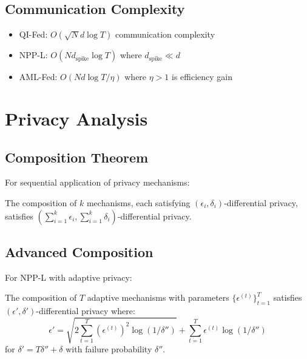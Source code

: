 \documentclass[12pt,a4paper]{article}
\begin{document}
\subsection{Communication Complexity}

\begin{theorem}
\begin{itemize}
\item QI-Fed: $O(\sqrt{N} d \log T)$ communication complexity
\item NPP-L: $O(N d_{\text{spike}} \log T)$ where $d_{\text{spike}} \ll d$
\item AML-Fed: $O(N d \log T / \eta)$ where $\eta > 1$ is efficiency gain
\end{itemize}
\end{theorem}

\section{Privacy Analysis}

\subsection{Composition Theorem}

For sequential application of privacy mechanisms:

\begin{theorem}
The composition of $k$ mechanisms, each satisfying $(\epsilon_i, \delta_i)$-differential privacy, satisfies $(\sum_{i=1}^k \epsilon_i, \sum_{i=1}^k \delta_i)$-differential privacy.
\end{theorem}

\subsection{Advanced Composition}

For NPP-L with adaptive privacy:

\begin{theorem}
The composition of $T$ adaptive mechanisms with parameters $\{\epsilon^{(t)}\}_{t=1}^T$ satisfies $(\epsilon', \delta')$-differential privacy where:
\begin{equation}
\epsilon' = \sqrt{2 \sum_{t=1}^T (\epsilon^{(t)})^2 \log(1/\delta'')} + \sum_{t=1}^T \epsilon^{(t)} \log(1/\delta'')
\end{equation}
for $\delta' = T\delta'' + \delta$ with failure probability $\delta''$.
\end{theorem}
\end{document}
